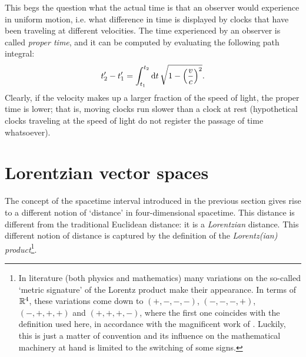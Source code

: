This begs the question what the actual time is that an observer would experience in uniform motion, i.e. what difference in time is displayed by clocks that have been traveling at different velocities. The time experienced by an observer is called \emph{proper time}, and it can be computed by evaluating the following path integral:
\begin{equation}
    t'_2 - t'_1 = \int^{t_2}_{t_1} \dd{t} \sqrt{1 - \qty(\frac{v}{c})^2}.
    \label{eq:proper_time}
\end{equation}
Clearly, if the velocity  makes up a larger fraction of the speed of light, the proper time is lower; that is, moving clocks run slower than a clock at rest (hypothetical clocks traveling at the speed of light do not register the passage of time whatsoever).

\section{Lorentzian vector spaces}
\label{sec:lorentz_metric}
The concept of the spacetime interval introduced in the previous section gives rise to a different notion of `distance' in four-dimensional spacetime. This distance is different from the traditional Euclidean distance: it is a \emph{Lorentzian} distance. This different notion of distance is captured by the definition of the \emph{Lorentz(ian) product}\footnote{In literature (both physics and mathematics) many variations on the so-called `metric signature' of the Lorentz product make their appearance. In terms of \(\mathbb{R}^4\), these variations come down to \((+,-,-,-)\), \((-,-,-,+)\), \((-,+,+,+)\) and \((+,+,+,-)\), where the first one coincides with the definition used here, in accordance with the magnificent work of \citet{Landau1971}. Luckily, this is just a matter of convention and its influence on the mathematical machinery at hand is limited to the switching of some signs.}.

